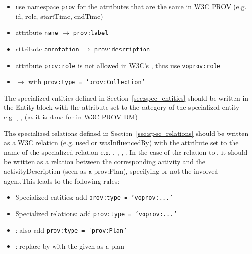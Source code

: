 \begin{itemize}
\item use namespace \texttt{prov} for the attributes that are the same in W3C PROV (e.g. id, role, startTime, endTime)
\item attribute \texttt{name} $\rightarrow$ \texttt{prov:label}
\item attribute \texttt{annotation} $\rightarrow$ \texttt{prov:description}
\item attribute \texttt{prov:role} is not allowed in W3C's , thus use \texttt{voprov:role}
\item {} $\rightarrow$  with \texttt{prov:type = 'prov:Collection'}
\end{itemize}

The specialized entities defined in Section~\ref{sec:spec_entities} should be written in the Entity block with the attribute  set to the category of the specialized entity e.g. , ,  (as it is done for  in W3C PROV-DM).

The specialized relations defined in Section~\ref{sec:spec_relations} should be written as a W3C relation (e.g. used or wasInfluencedBy) with the attribute  set to the name of the specialized relation e.g. , , , .
In the case of the  relation to , it should be written as a  relation between the corresponding activity and the activityDescription (seen as a prov:Plan), specifying or not the involved agent.This leads to the following rules:

\begin{itemize}
\item Specialized entities: add \texttt{prov:type = 'voprov:...'}
\item Specialized relations: add \texttt{prov:type = 'voprov:...'}
\item {}: also add \texttt{prov:type = 'prov:Plan'}
\item {}: replace by  with the  given as a plan
\end{itemize}


